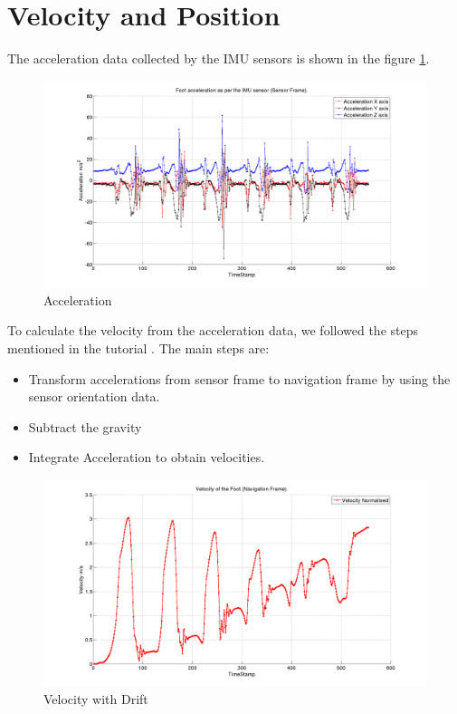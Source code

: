 \documentclass[12pt]{article}
\begin{document}
\section*{Velocity and Position}

The acceleration data collected by the IMU sensors is shown in the figure \ref{acceleration}.
\begin{figure}[!htb]
\centering
\includegraphics[scale=.3]{acceleration.png}
\caption{Acceleration}
\label{acceleration}
\end{figure}

To calculate the velocity from the acceleration data, we followed the steps mentioned in the tutorial \cite{6127851}. The main steps are:
\begin{itemize}
\item Transform accelerations from sensor frame to navigation frame by using the sensor orientation data.
\item Subtract the gravity
\item Integrate Acceleration to obtain velocities.
\end{itemize}

\begin{figure}[!htb]
\centering
\includegraphics[scale=.3]{velocityDrift.png}
\caption{Velocity with Drift}
\label{velocityDrift}
\end{figure}
\end{document}
